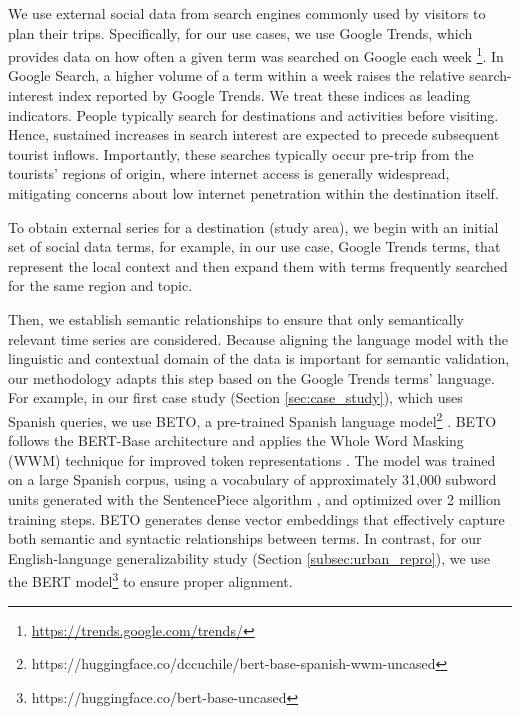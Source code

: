 \documentclass[acmsmall]{acmart}
\begin{document}
{\color{black}We use external social data from search engines commonly used by visitors to plan their trips. Specifically, for our use cases, we use Google Trends, which provides data on how often a given term was searched on Google each week \footnote{\url{https://trends.google.com/trends/}}. In Google Search, a higher volume of a term within a week raises the relative search-interest index reported by Google Trends. We treat these indices as leading indicators. People typically search for destinations and activities before visiting. Hence, sustained increases in search interest are expected to precede subsequent tourist inflows. Importantly, these searches typically occur pre-trip from the tourists' regions of origin, where internet access is generally widespread, mitigating concerns about low internet penetration within the destination itself. 
}

{\color{black}
 To obtain external series for a destination (study area), we begin with an initial set of social data terms, for example, in our use case, Google Trends terms, that represent the local context and then expand them with terms frequently searched for the same region and topic.
}

Then, we establish semantic relationships to ensure that only semantically relevant time series are considered. {\color{black} Because aligning the language model with the linguistic and contextual domain of the data is important for semantic validation, our methodology adapts this step based on the Google Trends terms' language. For example, in our first case study (Section \ref{sec:case_study}), which uses Spanish queries, we use BETO, a pre-trained Spanish language model\footnote{https://huggingface.co/dccuchile/bert-base-spanish-wwm-uncased} \cite{canete2023spanish}.} BETO follows the BERT-Base architecture and applies the Whole Word Masking (WWM) technique for improved token representations \cite{devlin2018bert}. The model was trained on a large Spanish corpus, using a vocabulary of approximately 31,000 subword units generated with the SentencePiece algorithm \cite{kudo2018sentencepiece}, and optimized over 2 million training steps. BETO generates dense vector embeddings that effectively capture both semantic and syntactic relationships between terms. {\color{black}In contrast, for our English-language generalizability study (Section \ref{subsec:urban_repro}), we use the BERT model\footnote{https://huggingface.co/bert-base-uncased} to ensure proper alignment.}
\end{document}
